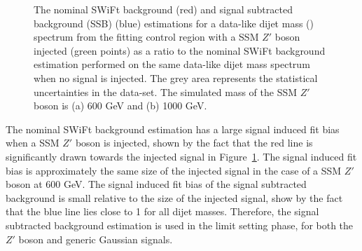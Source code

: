 \begin{figure}[!ht]
  \begin{center}
    \captionsetup[subfigure]{aboveskip=0pt,justification=centering}
  \end{center}
  \vspace{-1mm}
  \caption[The nominal SWiFt background and signal subtracted background (SSB) estimations
    for a data-like dijet mass  spectrum from the fitting control region with a SSM $Z'$ boson injected
    as a ratio to the nominal SWiFt background estimation performed on the same data-like dijet mass spectrum when no signal is injected.]
          {The nominal SWiFt background (red) and signal subtracted background (SSB) (blue) estimations
    for a data-like dijet mass (\mjj) spectrum from the fitting control region with a SSM $Z'$ boson injected (green points)
    as a ratio to the nominal SWiFt background estimation performed on the same data-like dijet mass spectrum when no signal is injected.
    The grey area represents the statistical uncertainties in the data-set.
    The simulated mass of the SSM $Z'$ boson is (a) 600 GeV and (b) 1000 GeV.}
  \label{fig:lim-lowmass_ssb_test}
\end{figure}

The nominal SWiFt background estimation has a large signal induced fit bias when a SSM $Z'$ boson is injected,
shown by the fact that the red line is significantly drawn towards the injected signal in Figure~\ref{fig:lim-lowmass_ssb_test}.
The signal induced fit bias is approximately the same size of the injected signal in the case of a SSM $Z'$ boson at 600 GeV.
The signal induced fit bias of the signal subtracted background is small relative to the size of the injected signal,
show by the fact that the blue line lies close to 1 for all dijet masses.
Therefore, the signal subtracted background estimation is used in the limit setting phase, for both the $Z'$ boson and generic Gaussian signals.

